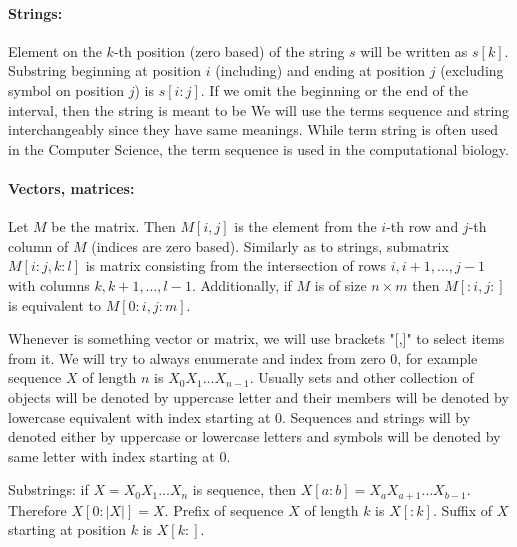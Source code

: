\paragraph{Strings:} Element on the $k$-th position (zero based) of the string $s$
will be written as $s[k]$. Substring beginning at position $i$ (including) and
ending at position $j$ (excluding symbol on position $j$) is $s[i:j]$.
If we omit the beginning or the end of the interval, then the string is meant to
be 
We will use the terms sequence and string interchangeably since they have
same meanings. While term string is often used in the Computer Science, the term
sequence is used in the computational biology.

\paragraph{Vectors, matrices:}
Let $M$ be the matrix. Then $M[i,j]$ is the element from the $i$-th row and
$j$-th column of $M$ (indices are zero based). Similarly as to strings,
submatrix $M[i:j,k:l]$ is matrix consisting from the intersection of rows
$i,i+1,\dots, j-1$ with columns $k,k+1,\dots,l-1$. Additionally, if 
$M$ is of size $n\times m$ then $M[:i,j:]$ is equivalent to $M[0:i,j:m]$.

Whenever is something vector or matrix, we will use brackets "[,]" to select
items from it. We will try to always enumerate and index from zero 0, for
example sequence $X$ of length $n$ is $X_0X_1\dots X_{n-1}$. Usually sets and
other collection of objects will be denoted by uppercase letter and their
members will be denoted by lowercase equivalent  with index starting at 0.
Sequences and strings will by denoted either by uppercase or lowercase letters
and symbols will be denoted by same letter with index starting at 0.

Substrings: if $X=X_0X_1\dots X_n$ is sequence, then
$X\left[a:b\right]=X_aX_{a+1}\dots X_{b-1}$. Therefore $X[0:|X|]=X$. Prefix of
sequence $X$ of length $k$ is $X[:k]$. Suffix of $X$ starting at position $k$ is
$X[k:]$.

